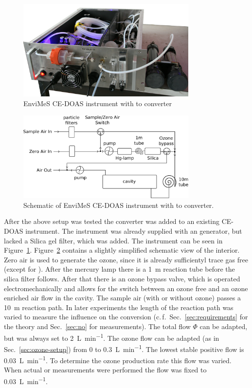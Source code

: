 \begin{figure}[htbp]
  \centering
  \includegraphics[width=0.8\textwidth]{images/InstrumentEdited_small.jpg}
  \caption{EnviMeS CE-DOAS instrument with  to 
    converter}
  \label{fig:envimes}
\end{figure}

\begin{figure}[htbp]
  \centering
  \includegraphics[width=0.8\textwidth]{images/envimes_setup.eps}
  \caption{Schematic of EnviMeS CE-DOAS instrument with  to
     converter.}
  \label{fig:envimes-schematic}
\end{figure}

After the above setup was tested the converter was added to an
existing CE-DOAS instrument. The instrument was already supplied with
an  generator, but lacked a Silica gel filter, which was
added. The instrument can be seen in
Figure~\ref{fig:envimes}. Figure~\ref{fig:envimes-schematic} contains
a slightly simplified schematic view of the interior. Zero air is
used to generate the ozone, since it is already sufficientyl trace gas
free (except for ). After the mercury lamp there is a
\SI{1}{\meter} reaction tube before the silica filter follows. After
that there is an ozone bypass valve, which is operated
electromechanically and allows for the switch between an ozone free and
an ozone enriched air flow in the cavity. The sample air (with or
without ozone) passes a \SI{10}{\meter} reaction path. In later
experiments the length of the reaction path was varied to measure the
influence on the  conversion (c.\,f.\
Sec.~\ref{sec:requirements} for the theory and Sec.~\ref{sec:no} for
measurements). The total flow $\Phi$ can be adapted, but was always
set to \SI{2}{\liter\per\minute}. The ozone flow can be adapted (as
in Sec.~\ref{sec:ozone-setup}) from 0 to
\SI{0.3}{\liter\per\minute}. The lowest stable positive flow is
\SI{0.03}{\liter\per\minute}. To determine the ozone production rate
this flow was varied. When actual \ch{NO} or \ch{NO_x} measurements
were performed the flow was fixed to \SI{0.03}{\liter\per\minute}.

